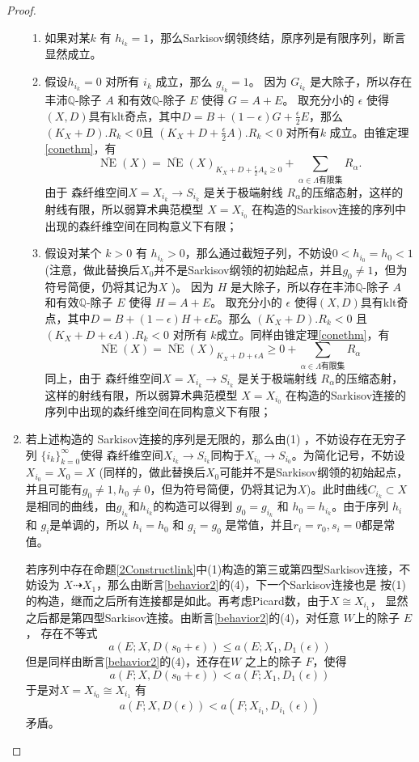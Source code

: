\begin{proof}
\begin{enumerate}
\begin{enumerate}
        \item 如果对某$k$ 有  $h_{i_{k}}=1$，那么Sarkisov纲领终结，原序列是有限序列，断言显然成立。
        \item 假设$h_{i_{k}}=0$ 对所有 $i_{k}$ 成立，那么 $g_{i_{k}}=1$。 因为 $G_{i_{k}}$ 是大除子，所以存在丰沛$\mathbb{Q}$-除子 $A$ 和有效$\mathbb{Q}$-除子 $E$ 使得 $G=A+E$。  取充分小的 $\epsilon$ 使得$(X,D)$具有klt奇点，其中$D=B+(1-\epsilon)G+\frac{\epsilon}{2} E$，那么 $(K_{X}+D).R_{k}<0$且 $(K_{X}+D+\frac{\epsilon}{2} A).R_{k}<0$ 对所有$k$ 成立。由锥定理\ref{conethm}，有
              \[ \overline{\operatorname{NE}}(X)=\overline{\operatorname{NE}}(X)_{K_{X}+D+\frac{\epsilon}{2}A_{k}\geqslant 0} +\sum_{\alpha \in\Lambda\text{有限集}}R_{\alpha}. \]
              由于 森纤维空间$X=X_{i_{k}}\to S_{i_{k}}$ 是关于极端射线 $R_{\alpha}$的压缩态射，这样的射线有限，所以弱算术典范模型 $X=X_{i_{0}}$ 在构造的Sarkisov连接的序列中出现的森纤维空间在同构意义下有限；
            \item 假设对某个 $k>0$ 有  $h_{i_{k}}>0$，那么通过截短子列，不妨设$0<h_{i_{0}}=h_{0}<1$ (注意，做此替换后$X_{0}$并不是Sarkisov纲领的初始起点，并且$g_{0}\neq 1$，但为符号简便，仍将其记为$X$  )。 因为 $H$ 是大除子，所以存在丰沛$\mathbb{Q}$-除子 $A$ 和有效$\mathbb{Q}$-除子 $E$ 使得 $H=A+E$。  取充分小的 $\epsilon$ 使得$(X,D)$具有klt奇点，其中$D=B+(1-\epsilon)H+\epsilon E$。那么 $(K_{X}+D).R_{k}<0$ 且 $(K_{X}+D+\epsilon A).R_{k}<0$ 对所有 $k$成立。同样由锥定理\ref{conethm}，有
              \[ \overline{\operatorname{NE}}(X)=\overline{\operatorname{NE}}(X)_{K_{X}+D+\epsilon A}\geqslant 0 +\sum_{\alpha \in\Lambda\text{有限集}}R_{\alpha} \]
              同上，由于 森纤维空间$X=X_{i_{k}}\to S_{i_{k}}$ 是关于极端射线 $R_{\alpha}$的压缩态射，这样的射线有限，所以弱算术典范模型 $X=X_{i_{0}}$ 在构造的Sarkisov连接的序列中出现的森纤维空间在同构意义下有限；
      \end{enumerate}
    \item 若上述构造的 Sarkisov连接的序列是无限的，那么由(1) ，不妨设存在无穷子列 $\{i_{k}\}_{k=0}^{\infty} $使得 森纤维空间$X_{i_{k}}\to S_{i_{k}}$同构于$X_{i_{0}}\to S_{i_{0}}$。为简化记号，不妨设$X_{i_{0}}=X_{0}=X$ (同样的，做此替换后$X_{0}$可能并不是Sarkisov纲领的初始起点，并且可能有$g_{0}\neq 1,h_{0}\neq 0$，但为符号简便，仍将其记为$X$)。此时曲线$C_{i_{k}} \subset X$是相同的曲线，由$g_{i_{k}}$和$h_{i_{k}}$的构造可以得到 $g_{0}=g_{i_{k}}$ 和 $h_{0}=h_{i_{k}}$。由于序列 $h_{i}$ 和 $g_{i}$是单调的，所以 $h_{i}=h_{0}$ 和  $g_{i}=g_{0}$ 是常值，并且$r_{i}=r_{0},s_{i}=0$都是常值。

      若序列中存在命题\ref{2Constructlink}中(1)构造的第三或第四型Sarkisov连接，不妨设为 $X\dashrightarrow X_{1}$，那么由断言\ref{behavior2}的(4)，下一个Sarkisov连接也是 按(1)的构造，继而之后所有连接都是如此。再考虑Picard数，由于$X\cong X_{i_{1}}$， 显然之后都是第四型Sarkisov连接。由断言\ref{behavior2}的(4)，对任意 $ W$上的除子 $E$， 存在不等式
      \[ a(E;X,D(s_{0}+\epsilon))\leqslant a(E;X_{1},D_{1}(\epsilon))\] 
      但是同样由断言\ref{behavior2}的(4)，还存在$W$ 之上的除子 $F$，使得 
      \[a(F;X,D(s_{0}+\epsilon))< a(F;X_{1},D_{1}(\epsilon))\]
      于是对$ X = X_{i_{0}}\cong X_{i_{1}} $ 有
      \[a(F;X,D(\epsilon))< a(F;X_{i_{1}},D_{i_{1}}(\epsilon))\]
      矛盾。


\end{enumerate}
\end{proof}
